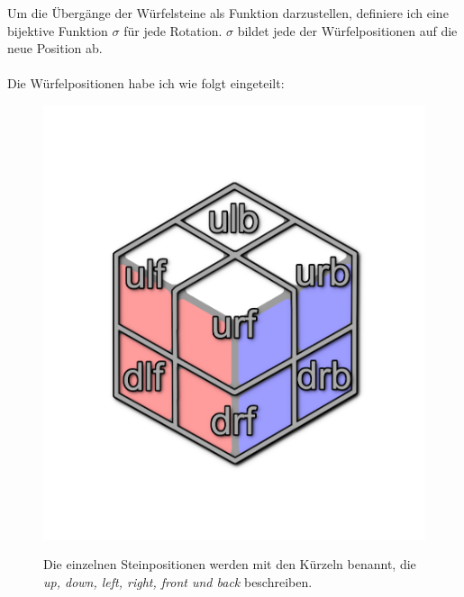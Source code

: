 \documentclass[12pt,a4paper, usenames, dvipsnames]{scrartcl}
\begin{document}
Um die Übergänge der Würfelsteine als Funktion darzustellen, definiere ich eine bijektive Funktion $\sigma$ für jede Rotation. $\sigma$ bildet jede der Würfelpositionen auf die neue Position ab. \\
\\
Die Würfelpositionen habe ich wie folgt eingeteilt: \\
\begin{figure}[H]
\centering
\includegraphics[scale=0.15]{caged_positions.png} \\
\caption{Die einzelnen Steinpositionen werden mit den Kürzeln benannt, die \textit{up, down, left, right, front und back} beschreiben.}
\end{figure}
\end{document}
